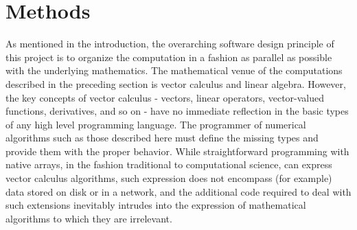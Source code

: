 %


\section{Methods}

As mentioned in the introduction, the overarching software design
principle of this project is to organize the computation in a fashion
as parallel as possible with the underlying mathematics. The
mathematical venue of the computations described in the preceding
section is vector calculus and linear algebra. However, the key
concepts of vector calculus - vectors, linear operators, vector-valued
functions, derivatives, and so on - have no immediate reflection in
the basic types of any high level programming language. The programmer
of numerical algorithms such as those described here must define the
missing types and provide them with the proper behavior. While
straightforward programming with native arrays, in the fashion
traditional to computational science, can express vector calculus
algorithms, such expression does not encompass (for example) data
stored on disk or in a network, and the additional code
required to deal with such extensions inevitably intrudes into the
expression of mathematical algorithms to which they are irrelevant.

